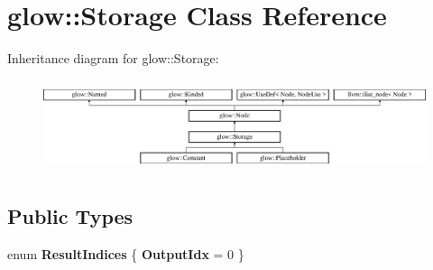 \hypertarget{classglow_1_1_storage}{}\section{glow\+:\+:Storage Class Reference}
\label{classglow_1_1_storage}
Inheritance diagram for glow\+:\+:Storage\+:\begin{figure}[H]
\begin{center}
\leavevmode
\includegraphics[height=2.705314cm]{classglow_1_1_storage}
\end{center}
\end{figure}
\subsection*{Public Types}
\begin{DoxyCompactItemize}
\item 
\mbox{\label{classglow_1_1_storage_a943cf00d1fa9c0ad7f76a11a9901db4c}} 
enum {\bfseries Result\+Indices} \{ {\bfseries Output\+Idx} = 0
 \}
\end{DoxyCompactItemize}
